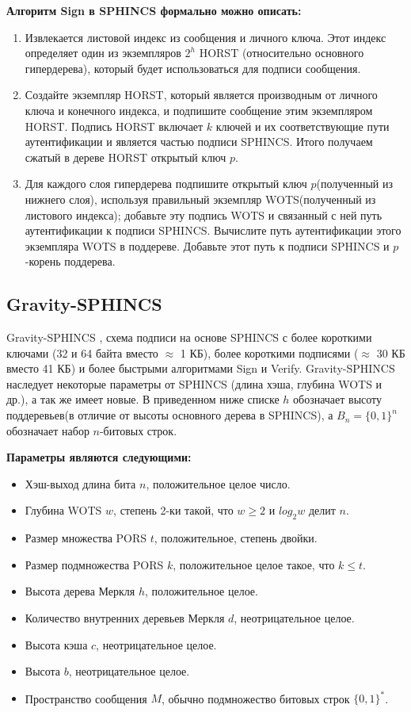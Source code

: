\documentclass[a4paper, 14pt]{extarticle}
\begin{document}
\textbf{Алгоритм Sign в SPHINCS формально можно описать:}

\begin{enumerate}
    \item Извлекается листовой индекс из сообщения и личного ключа. Этот индекс определяет один из экземпляров $2^{h}$ HORST (относительно основного гипердерева), который будет использоваться для подписи сообщения.
    \item Создайте экземпляр HORST, который является производным от личного ключа и конечного индекса, и подпишите сообщение этим экземпляром HORST. Подпись HORST включает $k$ ключей и их соответствующие пути аутентификации и является частью подписи SPHINCS. Итого получаем сжатый в дереве HORST открытый ключ $p$.
    \item Для каждого слоя гипердерева подпишите открытый ключ $p$(полученный из нижнего слоя), используя правильный экземпляр WOTS(полученный из листового индекса); добавьте эту подпись WOTS и связанный с ней путь аутентификации к подписи SPHINCS. Вычислите путь аутентификации этого экземпляра WOTS в поддереве. Добавьте этот путь к подписи SPHINCS и $p$-корень поддерева.
\end{enumerate}

\subsection{Gravity-SPHINCS}
Gravity-SPHINCS \cite{stateless}, схема подписи на основе SPHINCS с более короткими ключами (32 и 64 байта вместо $\approx$ 1 КБ), более короткими подписями ($\approx$ 30 КБ вместо 41 КБ) и более быстрыми алгоритмами Sign и Verify.
Gravity-SPHINCS наследует некоторые параметры от SPHINCS (длина хэша, глубина WOTS и др.), а так же имеет новые. В приведенном ниже списке $h$ обозначает высоту поддеревьев(в отличие от высоты основного дерева в SPHINCS), а $B_{n} = \{0,1\}^{n}$ обозначает набор $n$-битовых строк.
\newline

\textbf{Параметры являются следующими:}

\begin{itemize}
    \item Хэш-выход длина бита $n$, положительное целое число.
    \item Глубина WOTS $w$, степень 2-ки такой, что $w \geq 2$ и $log_{2}w$ делит $n$.
    \item Размер множества PORS $t$, положительное, степень двойки.
    \item Размер подмножества PORS $k$, положительное целое такое, что $k \leq t$.
    \item Высота дерева Меркля $h$, положительное целое.
    \item Количество внутренних деревьев Меркля $d$, неотрицательное целое.
    \item Высота кэша $c$, неотрицательное целое.
    \item Высота $b$, неотрицательное целое.
    \item Пространство сообщения $M$, обычно подмножество битовых строк $\{0,1\}^{*}$.
\end{itemize}
\end{document}

